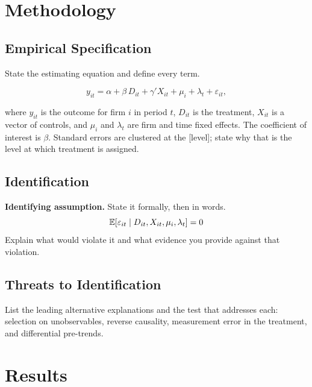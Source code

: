 \documentclass[letterpaper,11pt]{article}
\begin{document}
\section{Methodology}
\label{sec:method}

\subsection{Empirical Specification}

State the estimating equation and define every term.

\begin{equation}
  y_{it} = \alpha + \beta \, D_{it} + \gamma' X_{it} + \mu_i + \lambda_t + \varepsilon_{it},
  \label{eq:main}
\end{equation}

\noindent where $y_{it}$ is the outcome for firm $i$ in period $t$, $D_{it}$ is
the treatment, $X_{it}$ is a vector of controls, and $\mu_i$ and $\lambda_t$
are firm and time fixed effects. The coefficient of interest is $\beta$.
Standard errors are clustered at the [level]; state why that is the level at
which treatment is assigned.

\subsection{Identification}

\begin{methodbox}
\textbf{Identifying assumption.} State it formally, then in words.
\[
  \mathbb{E}\!\left[\varepsilon_{it} \mid D_{it}, X_{it}, \mu_i, \lambda_t\right] = 0
\]
Explain what would violate it and what evidence you provide against that
violation.
\end{methodbox}

\subsection{Threats to Identification}

List the leading alternative explanations and the test that addresses each:
selection on unobservables, reverse causality, measurement error in the
treatment, and differential pre-trends.

\section{Results}
\label{sec:results}
\end{document}
